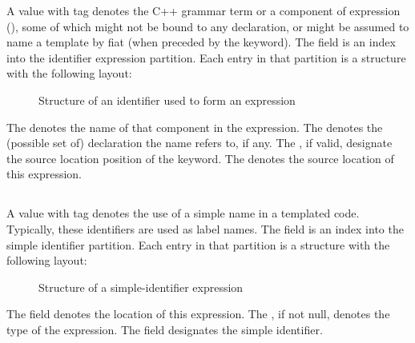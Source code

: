 A  value with tag 
 denotes the C++ grammar term  or a component of  expression (),
 some of which might
not be bound to any declaration, or might be assumed to name a template by fiat (when preceded by the  keyword).
The  field is an index into the identifier expression partition.  Each entry in that partition
is a structure with the following layout:
%
\begin{figure}[H]
	\centering
	\caption{Structure of an identifier used to form an expression}
	\label{fig:ifc-identifier-expr-structure}
\end{figure}
%
The  denotes the name of that component in the  expression.
The  denotes the (possible set of) declaration the name refers to, if any.
The , if valid, designate the source location position of the  keyword.
The  denotes the source location of this expression.




\subsection{}
\label{sec:ifc:ExprSort:SimpleIdentifier}

A  value with tag  denotes the use of a simple name 
in a templated code.  Typically, these identifiers are used as label names.  The  field is an index
into the simple identifier partition.  Each entry in that partition is a structure with the following layout:
%
\begin{figure}[H]
	\centering
	\caption{Structure of a simple-identifier expression}
	\label{fig:ifc-simple-identifier-structure}
\end{figure}
%
The  field denotes the location of this expression.  The , if not null, denotes the
type of the expression.  The  field designates the simple identifier.

